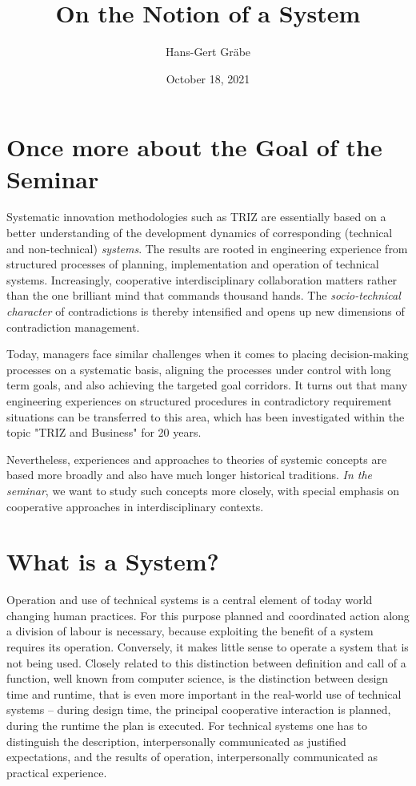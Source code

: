\documentclass[11pt,a4paper]{article}
\title{On the Notion of a System}
\author{Hans-Gert Gr\"abe}
\date{October 18, 2021}
\begin{document}
\maketitle

\section{Once more about the Goal of the Seminar}

Systematic innovation methodologies such as TRIZ are essentially based on a
better understanding of the development dynamics of corresponding (technical
and non-technical) \emph{systems}.  The results are rooted in engineering
experience from structured processes of planning, implementation and operation
of technical systems. Increasingly, cooperative interdisciplinary
collaboration matters rather than the one brilliant mind that commands
thousand hands. The \emph{socio-technical character} of contradictions is
thereby intensified and opens up new dimensions of contradiction management.

Today, managers face similar challenges when it comes to placing
decision-making processes on a systematic basis, aligning the processes under
control with long term goals, and also achieving the targeted goal corridors.
It turns out that many engineering experiences on structured procedures in
contradictory requirement situations can be transferred to this area, which
has been investigated within the topic "TRIZ and Business" for 20 years.

Nevertheless, experiences and approaches to theories of systemic concepts are
based more broadly and also have much longer historical traditions.  \emph{In
  the seminar}, we want to study such concepts more closely, with special
emphasis on cooperative approaches in interdisciplinary contexts.

\section{What is a System?}

Operation and use of technical systems is a central element of today world
changing human practices. For this purpose planned and coordinated action
along a division of labour is necessary, because exploiting the benefit of a
system requires its operation. Conversely, it makes little sense to operate a
system that is not being used. Closely related to this distinction between
definition and call of a function, well known from computer science, is the
distinction between design time and runtime, that is even more important in
the real-world use of technical systems – during design time, the principal
cooperative interaction is planned, during the runtime the plan is
executed. For technical systems one has to distinguish the description,
interpersonally communicated as justified expectations, and the results of
operation, interpersonally communicated as practical experience.
\end{document}
